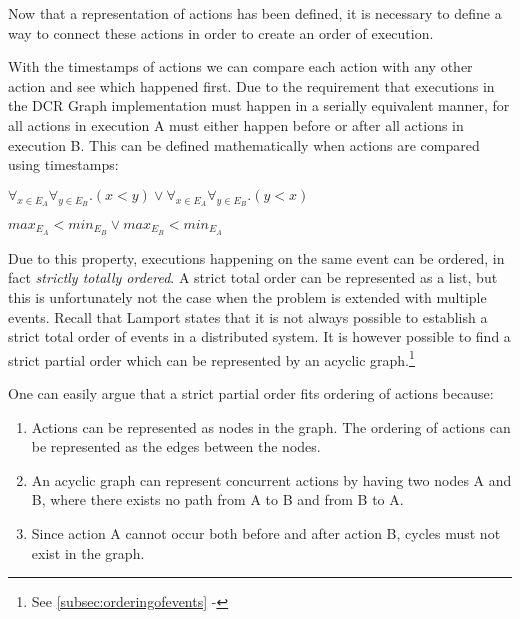 	\newpar Now that a representation of actions has been defined, it is necessary to define a way to connect these actions in order to create an order of execution.
	
	\newpar With the timestamps of actions we can compare each action with any other action and see which happened first. Due to the requirement that executions in the DCR Graph implementation must happen in a serially equivalent manner, for all actions in execution A must either happen before or after all actions in execution B. This can be defined mathematically when actions are compared using timestamps:
	
	\begin{center}
		$\forall_{x \in E_A}\forall_{y \in E_B} . (x < y) \lor \forall_{x \in E_A}\forall_{y \in E_B} . (y < x)$ 
	\end{center}

	\begin{center}
		$max_{E_A} < min_{E_B} \lor max_{E_B} < min_{E_A}$
	\end{center}
	
	\newpar Due to this property, executions happening on the same event can be ordered, in fact \textit{strictly totally ordered}. A strict total order can be represented as a list, but this is unfortunately not the case when the problem is extended with multiple events. Recall that Lamport states  that it is not always possible to establish a strict total order of events in a distributed system. It is however possible to find a strict partial order which can be represented by an acyclic graph.\footnote{See \autoref{subsec:orderingofevents} - } 
	
	\newpar One can easily argue that a strict partial order fits ordering of actions because:
	
	\begin{enumerate}
		\item Actions can be represented as nodes in the graph. The ordering of actions can be represented as the edges between the nodes.
		\item An acyclic graph can represent concurrent actions by having two nodes A and B, where there exists no path from A to B and from B to A.
		\item Since action A cannot occur both before and after action B, cycles must not exist in the graph.
	\end{enumerate}
	

